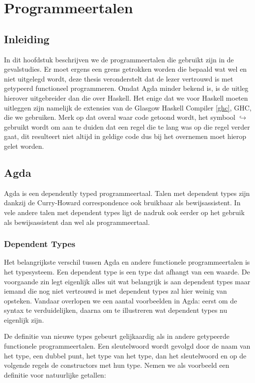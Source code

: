 \chapter{Programmeertalen}
\label{ch:agda-haskell}


\section{Inleiding}

In dit hoofdstuk beschrijven we de programmeertalen die gebruikt zijn in de
gevalstudies. Er moet ergens een grens getrokken worden die bepaald wat wel en
niet uitgelegd wordt, deze thesis veronderstelt dat de lezer vertrouwd is met
getypeerd functioneel programmeren. Omdat Agda minder bekend is, is de uitleg
hierover uitgebreider dan die over Haskell. Het enige dat we voor Haskell
moeten uitleggen zijn namelijk de extensies van de Glasgow Haskell Compiler
\ref{ghc}, GHC, die we gebruiken. Merk op dat overal waar code getoond wordt,
het symbool {\tiny\ensuremath{\hookrightarrow}} gebruikt wordt om aan te duiden
dat een regel die te lang was op die regel verder gaat, dit resulteert niet
altijd in geldige code dus bij het overnemen moet hierop gelet worden.


\section{Agda}

Agda is een dependently typed programmeertaal. Talen met dependent types zijn
dankzij de Curry-Howard correspondence ook bruikbaar als bewijsassistent. In
vele andere talen met dependent types ligt de nadruk ook eerder op het gebruik
als bewijsassistent dan wel als programmeertaal.

\subsection{Dependent Types}
\label{sec:indfamagda}

Het belangrijkste verschil tussen Agda en andere functionele programmeertalen
is het typesysteem. Een dependent type is een type dat afhangt van een waarde.
De voorgaande zin legt eigenlijk alles uit wat belangrijk is aan dependent
types maar iemand die nog niet vertrouwd is met dependent types zal hier weinig
van opsteken. Vandaar overlopen we een aantal voorbeelden in Agda: eerst om de
syntax te verduidelijken, daarna om te illustreren wat dependent types nu
eigenlijk zijn.

De definitie van nieuwe types gebeurt gelijkaardig als in andere getypeerde
functionele programmeertalen. Een  sleutelwoord wordt gevolgd door
de naam van het type, een dubbel punt, het type van het type, dan het
sleutelwoord  en op de volgende regels de constructors met hun
type. Nemen we als voorbeeld een definitie voor natuurlijke getallen:

